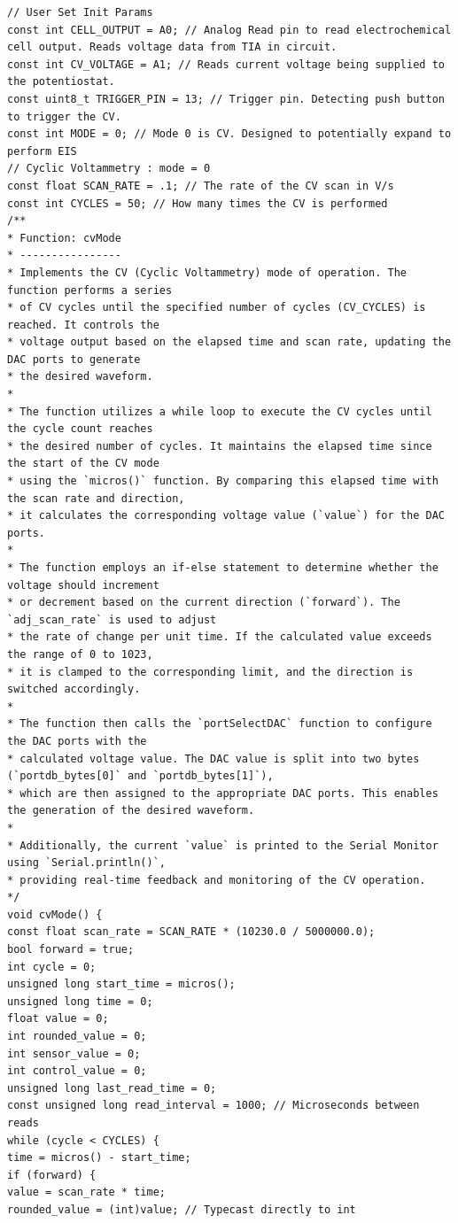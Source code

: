 \documentclass{article}
\begin{document}
\begin{lstlisting}
// User Set Init Params
const int CELL_OUTPUT = A0; // Analog Read pin to read electrochemical cell output. Reads voltage data from TIA in circuit.
const int CV_VOLTAGE = A1; // Reads current voltage being supplied to the potentiostat.
const uint8_t TRIGGER_PIN = 13; // Trigger pin. Detecting push button to trigger the CV.
const int MODE = 0; // Mode 0 is CV. Designed to potentially expand to perform EIS
// Cyclic Voltammetry : mode = 0
const float SCAN_RATE = .1; // The rate of the CV scan in V/s
const int CYCLES = 50; // How many times the CV is performed
/**
* Function: cvMode
* ----------------
* Implements the CV (Cyclic Voltammetry) mode of operation. The function performs a series
* of CV cycles until the specified number of cycles (CV_CYCLES) is reached. It controls the
* voltage output based on the elapsed time and scan rate, updating the DAC ports to generate
* the desired waveform.
*
* The function utilizes a while loop to execute the CV cycles until the cycle count reaches
* the desired number of cycles. It maintains the elapsed time since the start of the CV mode
* using the `micros()` function. By comparing this elapsed time with the scan rate and direction,
* it calculates the corresponding voltage value (`value`) for the DAC ports.
*
* The function employs an if-else statement to determine whether the voltage should increment
* or decrement based on the current direction (`forward`). The `adj_scan_rate` is used to adjust
* the rate of change per unit time. If the calculated value exceeds the range of 0 to 1023,
* it is clamped to the corresponding limit, and the direction is switched accordingly.
*
* The function then calls the `portSelectDAC` function to configure the DAC ports with the
* calculated voltage value. The DAC value is split into two bytes (`portdb_bytes[0]` and `portdb_bytes[1]`),
* which are then assigned to the appropriate DAC ports. This enables the generation of the desired waveform.
*
* Additionally, the current `value` is printed to the Serial Monitor using `Serial.println()`,
* providing real-time feedback and monitoring of the CV operation.
*/
void cvMode() {
const float scan_rate = SCAN_RATE * (10230.0 / 5000000.0);
bool forward = true;
int cycle = 0;
unsigned long start_time = micros();
unsigned long time = 0;
float value = 0;
int rounded_value = 0;
int sensor_value = 0;
int control_value = 0;
unsigned long last_read_time = 0;
const unsigned long read_interval = 1000; // Microseconds between reads
while (cycle < CYCLES) {
time = micros() - start_time;
if (forward) {
value = scan_rate * time;
rounded_value = (int)value; // Typecast directly to int

\end{lstlisting}
\end{document}

